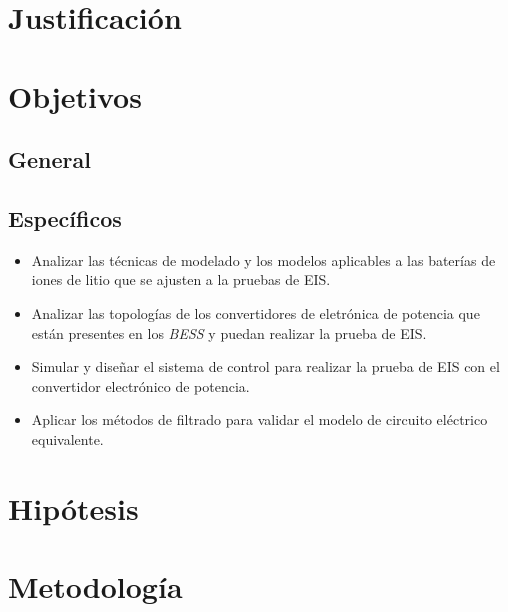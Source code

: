 \section{Justificación}


 
\section{Objetivos}

\subsection{General}

\subsection{Específicos}
\begin{itemize}
	\item Analizar las técnicas de modelado y los modelos aplicables a las baterías de iones de litio que se ajusten a la pruebas de EIS. 
	\item Analizar las topologías de los convertidores de eletrónica de potencia que están presentes en los \emph{BESS} y puedan realizar la prueba de EIS.
	\item Simular y diseñar el sistema de control para realizar la prueba de EIS con el convertidor electrónico de potencia.
	  \item Aplicar los métodos de filtrado para validar el modelo de circuito eléctrico equivalente.
\end{itemize}

\section{Hipótesis}

\section{Metodología}


